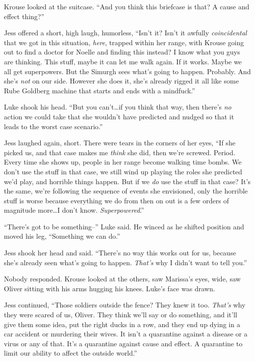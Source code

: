 Krouse looked at the suitcase.  ``And you think this briefcase is that?  A cause and effect thing?''



Jess offered a short, high laugh, humorless, ``Isn't it?  Isn't it awfully \emph{coincidental} that we got in this situation, \emph{here}, trapped within her range, with Krouse going out to find a doctor for Noelle and finding this instead?  I know what you guys are thinking.  This stuff, maybe it can let me walk again.  If it works.  Maybe we all get superpowers.  But the Simurgh sees what's going to happen.  Probably.  And she's \emph{not} on our side.  However she does it, she's already rigged it all like some Rube Goldberg machine that starts and ends with a mindfuck.''



Luke shook his head.  ``But you can't\ldots if you think that way, then there's \emph{no} action we could take that she wouldn't have predicted and nudged so that it leads to the worst case scenario.''



Jess laughed again, short.  There were tears in the corners of her eyes, ``If she picked us, and that case makes me \emph{think} she did, then we're screwed.  Period.  Every time she shows up, people in her range become walking time bombs.  We don't use the stuff in that case, we still wind up playing the roles she predicted we'd play, and horrible things happen.  But if we \emph{do} use the stuff in that case?  It's the same, we're following the sequence of events she envisioned, only the horrible stuff is worse because everything we do from then on out is a few orders of magnitude more\ldots I don't know.  \emph{Superpowered}.''



``There's got to be something--'' Luke said.  He winced as he shifted position and moved his leg, ``Something we can do.''



Jess shook her head and said.  ``There's no way this works out for us, because she's already seen what's going to happen.  \emph{That's} why I didn't want to tell you.''



Nobody responded.  Krouse looked at the others, saw Marissa's eyes, wide, saw Oliver sitting with his arms hugging his knees.  Luke's face was drawn.



Jess continued, ``Those soldiers outside the fence?  They knew it too.  \emph{That's} why they were scared of us, Oliver.  They think we'll say or do something, and it'll give them some idea, put the right ducks in a row, and they end up dying in a car accident or murdering their wives.  It isn't a quarantine against a disease or a virus or any of that.  It's a quarantine against cause and effect.  A quarantine to limit our ability to affect the outside world.''



